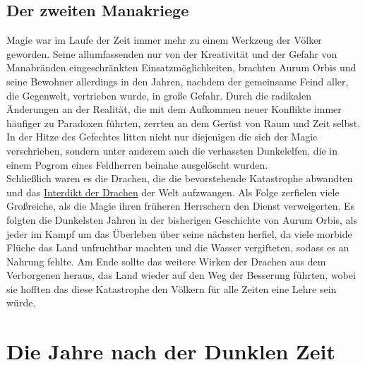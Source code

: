 \documentclass[a4paper,12pt,oneside]{book}
\begin{document}
\section{Der zweiten Manakriege}
Magie war im Laufe der Zeit immer mehr zu einem Werkzeug der Völker geworden. Seine allumfassenden nur von der Kreativität und der Gefahr von Manabränden eingeschränkten Einsatzmöglichkeiten, brachten Aurum Orbis und seine Bewohner allerdings in den Jahren, nachdem der gemeinsame Feind aller, die Gegenwelt, vertrieben wurde, in große Gefahr. Durch die radikalen Änderungen an der Realität, die mit dem Aufkommen neuer Konflikte immer häufiger zu Paradoxen führten, zerrten an dem Gerüst von Raum und Zeit selbst. In der Hitze des Gefechtes litten nicht nur diejenigen die sich der Magie verschrieben, sondern unter anderem auch die verhassten Dunkelelfen, die in einem Pogrom eines Feldherren beinahe ausgelöscht wurden.
\\Schließlich waren es die Drachen, die die bevorstehende Katastrophe abwandten und das \uline{Interdikt der Drachen} der Welt aufzwangen. Als Folge zerfielen viele Großreiche, als die Magie ihren früheren Herrschern den Dienst verweigerten. Es folgten die Dunkelsten Jahren in der bisherigen Geschichte von Aurum Orbis, als jeder im Kampf um das Überleben über seine nächsten herfiel, da viele morbide Flüche das Land unfruchtbar machten und die Wasser vergifteten, sodass es an Nahrung fehlte. Am Ende sollte das weitere Wirken der Drachen aus dem Verborgenen heraus, das Land wieder auf den Weg der Besserung führten, wobei sie hofften das diese Katastrophe den Völkern für alle Zeiten eine Lehre sein würde.

\chapter{Die Jahre nach der Dunklen Zeit}
\end{document}
